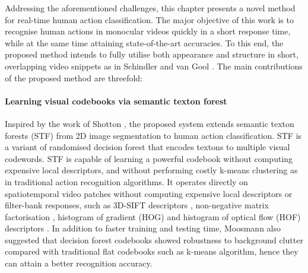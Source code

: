 Addressing the aforementioned challenges, this chapter presents a novel method for real-time human action classification. The major objective of this work is to recognise human actions in monocular videos quickly in a short response time, while at the same time attaining state-of-the-art accuracies. To this end, the proposed method intends to fully utilise both appearance and structure in short, overlapping video snippets as in Schindler and van Gool \cite{Schindler2008}. The main contributions of the proposed method are threefold:  

\paragraph{Learning visual codebooks via semantic texton forest} 
Inspired by the work of Shotton \etal \cite{Shotton2008}, the proposed system extends semantic texton forests (STF) from 2D image segmentation to human action classification. STF is a variant of randomised decision forest \cite{Ho1995, Amit1997, Breiman2001} that encodes textons to multiple visual codewords. STF is capable of learning a powerful codebook without computing expensive local descriptors, and without performing costly k-means clustering as in traditional action recognition algorithms. It operates directly on spatiotemporal video patches without computing expensive local descriptors or filter-bank responses, such as 3D-SIFT descriptors \cite{Scovanner2007}, non-negative matrix factorisation \cite{Wong2007}, histogram of gradient (HOG) \cite{Schuldt2004, Laptev2008} and histogram of optical flow (HOF) descriptors \cite{Riemenschneider2009}. 
In addition to faster training and testing time, Moosmann \etal \cite{Moosmann2007} also suggested that decision forest codebooks showed robustness to background clutter compared with traditional flat codebooks such as k-means algorithm, hence they can attain a better recognition accuracy.  


